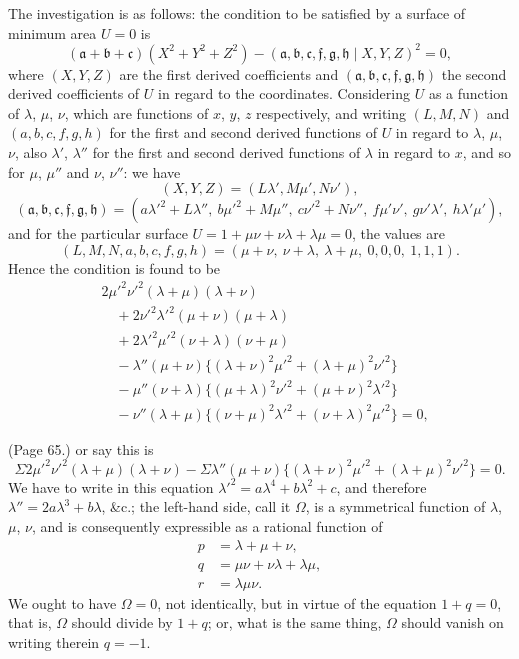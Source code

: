 \documentclass[11pt,a4paper]{article}
\begin{document}
The investigation is as follows: the condition to be satisfied by a surface of minimum area $U = 0$ is
\[
(\mathfrak{a} + \mathfrak{b} + \mathfrak{c})(X^2 + Y^2 + Z^2) - (\mathfrak{a}, \mathfrak{b}, \mathfrak{c}, \mathfrak{f}, \mathfrak{g}, \mathfrak{h} \mid X, Y, Z)^2 = 0,
\]
where $(X, Y, Z)$ are the first derived coefficients and $(\mathfrak{a}, \mathfrak{b}, \mathfrak{c}, \mathfrak{f}, \mathfrak{g}, \mathfrak{h})$ the second derived coefficients of $U$ in regard to the coordinates. Considering $U$ as a function of $\lambda$, $\mu$, $\nu$, which are functions of $x$, $y$, $z$ respectively, and writing $(L, M, N)$ and $(a, b, c, f, g, h)$ for the first and second derived functions of $U$ in regard to $\lambda$, $\mu$, $\nu$, also $\lambda'$, $\lambda''$ for the first and second derived functions of $\lambda$ in regard to $x$, and so for $\mu$, $\mu''$ and $\nu$, $\nu''$: we have
\[
(X, Y, Z) = (L\lambda', M\mu', N\nu'),
\]
\[
(\mathfrak{a}, \mathfrak{b}, \mathfrak{c}, \mathfrak{f}, \mathfrak{g}, \mathfrak{h}) = (a\lambda'^2 + L\lambda'',\ b\mu'^2 + M\mu'',\ c\nu'^2 + N\nu'',\ f\mu'\nu',\ g\nu'\lambda',\ h\lambda'\mu'),
\]
and for the particular surface $U = 1 + \mu\nu + \nu\lambda + \lambda\mu = 0$, the values are
\[
(L, M, N, a, b, c, f, g, h) = (\mu + \nu,\ \nu + \lambda,\ \lambda + \mu,\ 0, 0, 0,\ 1, 1, 1).
\]
Hence the condition is found to be
\begin{align*}
&2\mu'^2 \nu'^2 (\lambda + \mu)(\lambda + \nu) \\
&\quad + 2\nu'^2 \lambda'^2 (\mu + \nu)(\mu + \lambda) \\
&\quad + 2\lambda'^2 \mu'^2 (\nu + \lambda)(\nu + \mu) \\
&\quad - \lambda'' (\mu + \nu)\{(\lambda + \nu)^2 \mu'^2 + (\lambda + \mu)^2 \nu'^2\} \\
&\quad - \mu''(\nu + \lambda)\{(\mu + \lambda)^2 \nu'^2 + (\mu + \nu)^2 \lambda'^2\} \\
&\quad - \nu''(\lambda + \mu)\{(\nu + \mu)^2 \lambda'^2 + (\nu + \lambda)^2 \mu'^2\} = 0,
\end{align*}

\bigskip

\noindent (Page 65.) or say this is
\[
\Sigma 2\mu'^2 \nu'^2 (\lambda + \mu)(\lambda + \nu) - \Sigma \lambda''(\mu + \nu)\{(\lambda + \nu)^2 \mu'^2 + (\lambda + \mu)^2 \nu'^2\} = 0.
\]
We have to write in this equation $\lambda'^2 = a\lambda^4 + b\lambda^2 + c$, and therefore $\lambda'' = 2a\lambda^3 + b\lambda$, \&c.; the left-hand side, call it $\Omega$, is a symmetrical function of $\lambda$, $\mu$, $\nu$, and is consequently expressible as a rational function of
\begin{align*}
p &= \lambda + \mu + \nu, \\
q &= \mu\nu + \nu\lambda + \lambda\mu, \\
r &= \lambda\mu\nu.
\end{align*}
We ought to have $\Omega = 0$, not identically, but in virtue of the equation $1 + q = 0$, that is, $\Omega$ should divide by $1 + q$; or, what is the same thing, $\Omega$ should vanish on writing therein $q = -1$.
\end{document}
